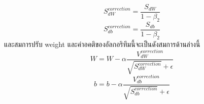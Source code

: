 \begin{enumerate}
\begin{equation}
		S^{correction}_{dW} = \frac{S_{dW}}{1 - \beta_2}
	\end{equation}
	\begin{equation}
		S^{correction}_{db} = \frac{S_{db}}{1 - \beta_2}
	\end{equation}
	และสมการปรับ weight และค่าอคติของอัลกอริทึมนี้จะเป็นดังสมการด้านล่างนี้ 
	\begin{equation}
		W = W - \alpha \frac{V^{correction}_{dW}}{\sqrt{S^{correction}_{dW}} + \epsilon}
	\end{equation}
	\begin{equation}
		b = b - \alpha \frac{V^{correction}_{db}}{\sqrt{S^{correction}_{db}} + \epsilon}
	\end{equation}
\end{enumerate}